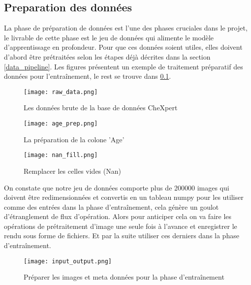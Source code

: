 \subsection{Preparation des données}
La phase de préparation de données est l'une des phases cruciales dans le projet, le livrable de cette phase est le jeu de données qui alimente le modèle d'apprentissage en profondeur. Pour que ces données soient utiles, elles doivent d'abord être prétraitées selon les étapes déjà décrites dans la section \ref{data_pipeline}. Les figures présentent un exemple de traitement préparatif des données pour l'entraînement, le rest se trouve dans \ref{}.
\begin{figure}[H]
    \centering
    \texttt{[image: raw\_data.png]}
    \caption{Les données brute de la base de données CheXpert}\label{fig:raw_data}
\end{figure}
\begin{figure}[H]
    \centering
    \texttt{[image: age\_prep.png]}
    \caption{La préparation de la colone 'Age'}\label{fig:age_prep}
\end{figure}
\begin{figure}[H]
    \centering
    \texttt{[image: nan\_fill.png]}
    \caption{Remplacer les celles vides (Nan)}\label{fig:nan_fill}
\end{figure}

On constate que notre jeu de données comporte plus de 200000 images qui doivent être redimensionnées et convertis en un tableau numpy pour les utiliser comme des entrées dans la phase d'entraînement, cela génère un goulot d’étranglement de flux d’opération. Alors pour anticiper cela on va faire les opérations de prétraitement d’image une seule fois à l'avance et enregistrer le rendu sous forme de fichiers. Et par la suite utiliser ces derniers dans la phase d'entraînement.

\begin{figure}[H]
    \centering
    \texttt{[image: input\_output.png]}
    \caption{Préparer les images et meta données pour la phase d'entraînement}\label{fig:input_output}
\end{figure}


